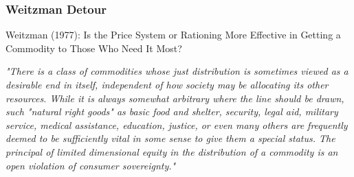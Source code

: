 \documentclass[handout,aspectratio=169]{beamer} %
\begin{document}
\begin{frame}
\frametitle{Weitzman Detour} 
Weitzman (1977): Is the Price System or Rationing More Effective in Getting a Commodity to Those Who Need It Most? \pause 

\small
\textit{"There is a class of commodities whose just distribution is sometimes viewed as a desirable end in itself, independent of how society may be allocating its other resources. While it is always somewhat arbitrary where the line should be drawn, such "natural right goods" as basic food and shelter, security, legal aid, military service, medical assistance, education, justice, or even many others are frequently deemed to be sufficiently vital in some sense to give them a special status. The principal of limited dimensional equity in the distribution of a commodity is an open violation of consumer sovereignty."}


\end{frame}
\end{document}

